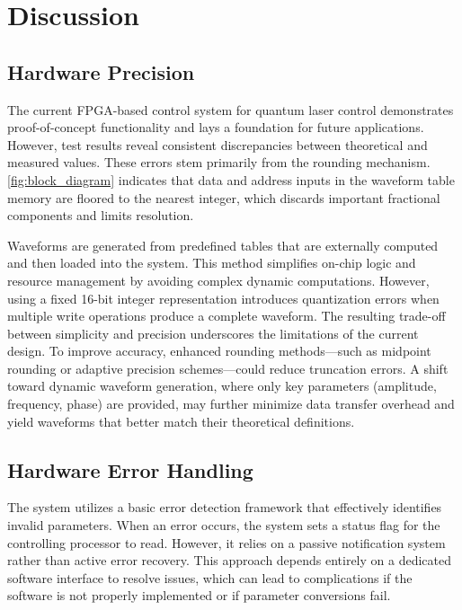 \chapter{Discussion}

\section{Hardware Precision}

The current FPGA-based control system for quantum laser control demonstrates proof-of-concept functionality and lays a foundation for future applications. However, test results reveal consistent discrepancies between theoretical and measured values. These errors stem primarily from the rounding mechanism. \autoref{fig:block_diagram} indicates that data and address inputs in the waveform table memory are floored to the nearest integer, which discards important fractional components and limits resolution.

Waveforms are generated from predefined tables that are externally computed and then loaded into the system. This method simplifies on-chip logic and resource management by avoiding complex dynamic computations. However, using a fixed 16-bit integer representation introduces quantization errors when multiple write operations produce a complete waveform. The resulting trade-off between simplicity and precision underscores the limitations of the current design. To improve accuracy, enhanced rounding methods—such as midpoint rounding or adaptive precision schemes—could reduce truncation errors. A shift toward dynamic waveform generation, where only key parameters (amplitude, frequency, phase) are provided, may further minimize data transfer overhead and yield waveforms that better match their theoretical definitions.

\section{Hardware Error Handling}

The system utilizes a basic error detection framework that effectively identifies invalid parameters. When an error occurs, the system sets a status flag for the controlling processor to read. However, it relies on a passive notification system rather than active error recovery. This approach depends entirely on a dedicated software interface to resolve issues, which can lead to complications if the software is not properly implemented or if parameter conversions fail.

